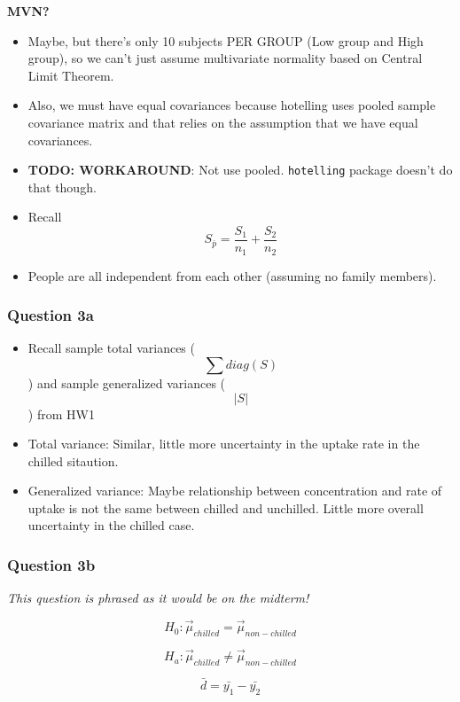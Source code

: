\textbf{MVN?}

\begin{itemize}
\tightlist
\item
  Maybe, but there's only 10 subjects PER GROUP (Low group and High
  group), so we can't just assume multivariate normality based on
  Central Limit Theorem.
\item
  Also, we must have equal covariances because hotelling uses pooled
  sample covariance matrix and that relies on the assumption that we
  have equal covariances.
\item
  \textbf{TODO: WORKAROUND}: Not use pooled. \texttt{hotelling} package
  doesn't do that though.
\item
  Recall \[ S_{\bar{p}} = \frac{S_1}{n_1} + \frac{S_2}{n_2} \]
\item
  People are all independent from each other (assuming no family
  members).
\end{itemize}

\hypertarget{question-3a}{%
\subsubsection{Question 3a}\label{question-3a}}

\begin{itemize}
\tightlist
\item
  Recall sample total variances (\[ \sum diag(S) \]) and sample
  generalized variances (\[ | S |\]) from HW1
\item
  Total variance: Similar, little more uncertainty in the uptake rate in
  the chilled sitaution.
\item
  Generalized variance: Maybe relationship between concentration and
  rate of uptake is not the same between chilled and unchilled. Little
  more overall uncertainty in the chilled case.
\end{itemize}

\hypertarget{question-3b}{%
\subsubsection{Question 3b}\label{question-3b}}

\emph{This question is phrased as it would be on the midterm!}

\[H_0: \vec{\mu}_{chilled} = \vec{\mu}_{non-chilled}\]

\[H_a: \vec{\mu}_{chilled} \ne \vec{\mu}_{non-chilled}\]

\[\bar{d} = \bar{y_1} - \bar{y_2}\]

